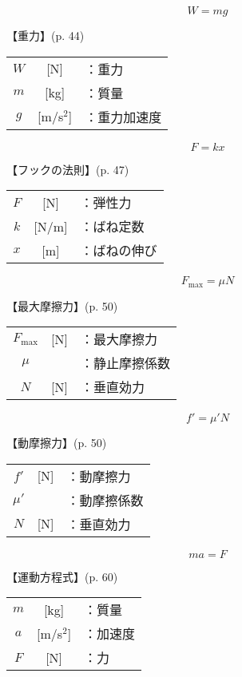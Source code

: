 \documentclass[10pt]{jarticle}
\begin{document}
\newpage
\[
	W = mg
\]


\vskip3mm
【重力】{\footnotesize (p. 44)}

\begin{tabular}{ccl}
$W$	&[N]	&：重力\\
$m$	&[kg]	&：質量\\
$g$	&[m/s$^2$]	&：重力加速度
\end{tabular}






\newpage
\[
	F = k x
\]


\vskip3mm
【フックの法則】{\footnotesize (p. 47)}

\begin{tabular}{ccl}
$F$	&[N]	&：弾性力\\
$k$	&[N/m]	&：ばね定数\\
$x$	&[m]	&：ばねの伸び
\end{tabular}






\newpage
\[
	F_\mathrm{max} =  \mu N
\]


\vskip3mm
【最大摩擦力】{\footnotesize (p. 50)}

\begin{tabular}{ccl}
$F_\mathrm{max}$	&[N]	&：最大摩擦力\\
$\mu$	&	&：静止摩擦係数\\
$N$	&[N]	&：垂直効力
\end{tabular}





\newpage
\[
	f' =  \mu' N
\]


\vskip3mm
【動摩擦力】{\footnotesize (p. 50)}

\begin{tabular}{ccl}
$f'$	&[N]	&：動摩擦力\\
$\mu'$	&	&：動摩擦係数\\
$N$	&[N]	&：垂直効力
\end{tabular}





\newpage
\[
	m a = F
\]


\vskip3mm
【運動方程式】{\footnotesize (p. 60)}

\begin{tabular}{ccl}
$m$	&[kg]	&：質量\\
$a$	&[m/s$^2$]	&：加速度\\
$F$	&[N]	&：力
\end{tabular}
\end{document}
